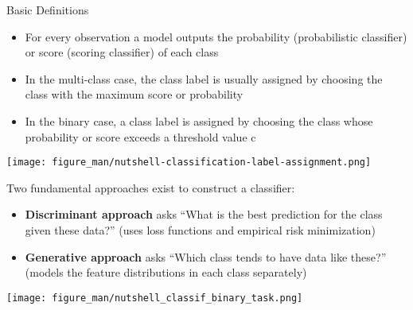 \documentclass[11pt,compress,t,notes=noshow, xcolor=table]{beamer}
\begin{document}
\begin{vbframe}{Basic Definitions}
\begin{itemize}
\item \small For every observation a model outputs the probability (probabilistic classifier) or score (scoring classifier) of each class
\item \small In the multi-class case, the class label is usually assigned by choosing the class with the maximum score or probability
\item \small In the binary case, a class label is assigned by choosing the class whose probability or score exceeds a threshold value c
\end{itemize}

\vspace{5mm}

\begin{center}
  \texttt{[image: figure\_man/nutshell-classification-label-assignment.png]}
\end{center}

Two fundamental approaches exist to construct a classifier:
\begin{itemize}
\item \small \textbf{Discriminant approach} asks ``What is the best prediction for the class given these data?'' (uses loss functions and empirical risk minimization)
\item \small \textbf{Generative approach} asks ``Which class tends to have data like these?'' (models the feature distributions in each class separately)

\end{itemize}

\begin{center}
  \texttt{[image: figure\_man/nutshell\_classif\_binary\_task.png]}
\end{center}
\end{vbframe}


\end{document}
